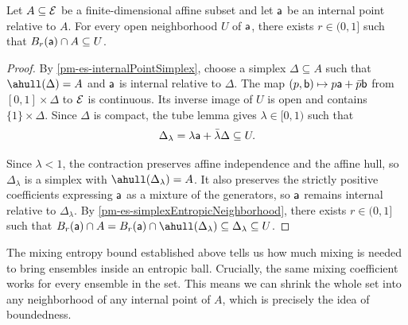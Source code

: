 \begin{mathSection}
	\begin{prop}\label{pm-es-finiteDimensionalEntropicNeighborhood}
		Let $A \subseteq \Ens$ be a finite-dimensional affine subset and let $\ens[a]$ be an internal point relative to $A$. For every open neighborhood $U$ of $\ens[a]$, there exists $r \in (0,1]$ such that $B_r(\ens[a]) \cap A \subseteq U$.
	\end{prop}
	
	\begin{proof}
		By \ref{pm-es-internalPointSimplex}, choose a simplex $\Delta \subseteq A$ such that $\ahull(\Delta)=A$ and $\ens[a]$ is internal relative to $\Delta$. The map $(p,\ens[b]) \mapsto p\ens[a]+\bar{p}\ens[b]$ from $[0,1]\times\Delta$ to $\Ens$ is continuous. Its inverse image of $U$ is open and contains $\{1\}\times\Delta$. Since $\Delta$ is compact, the tube lemma gives $\lambda \in [0,1)$ such that
		\begin{equation}
			\Delta_\lambda = \lambda\ens[a]+\bar{\lambda}\Delta \subseteq U.
		\end{equation}
		
		Since $\lambda<1$, the contraction preserves affine independence and the affine hull, so $\Delta_\lambda$ is a simplex with $\ahull(\Delta_\lambda)=A$. It also preserves the strictly positive coefficients expressing $\ens[a]$ as a mixture of the generators, so $\ens[a]$ remains internal relative to $\Delta_\lambda$. By \ref{pm-es-simplexEntropicNeighborhood}, there exists $r \in (0,1]$ such that $B_r(\ens[a])\cap A = B_r(\ens[a])\cap\ahull(\Delta_\lambda) \subseteq \Delta_\lambda \subseteq U$.
	\end{proof}
\end{mathSection}

The mixing entropy bound established above tells us how much mixing is needed to bring ensembles inside an entropic ball. Crucially, the same mixing coefficient works for every ensemble in the set. This means we can shrink the whole set into any neighborhood of any internal point of $A$, which is precisely the idea of boundedness.

